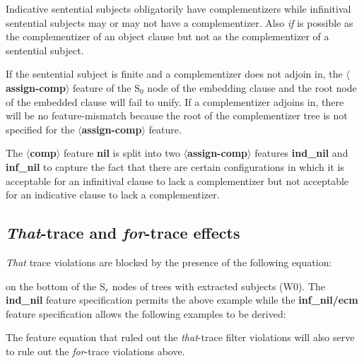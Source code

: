 
Indicative sentential subjects obligatorily have complementizers while
infinitival sentential subjects may or may not have a complementizer. 
Also {\em if} is possible as the complementizer of an object clause
but not as the complementizer of a sentential subject.


If the sentential subject is finite and a complementizer does
not adjoin in, the {\bf $\langle$assign-comp$\rangle$} feature of the 
S$_{0}$ node of the embedding clause and the root node of the
embedded clause will fail to unify. If a complementizer adjoins in,
there will be no feature-mismatch because the root of the
complementizer tree is not specified for the {\bf $\langle$assign-comp$\rangle$} feature.

The {\bf $\langle$comp$\rangle$} feature {\bf nil} is split into two
{\bf $\langle$assign-comp$\rangle$} features {\bf ind\_nil} and
{\bf inf\_nil} to capture the fact that there are certain configurations in
which it is acceptable for an infinitival clause to lack a complementizer
but not acceptable for an indicative clause to lack a complementizer. 

\subsection{{\em That}-trace and {\em for}-trace effects}


{\em That} trace violations are blocked by the presence of the following
equation:


on the bottom of the S$_{r}$ nodes of trees with extracted subjects (W0). 
The {\bf ind\_nil} feature specification permits the above example
while the {\bf inf\_nil/ecm} feature specification allows the
following examples to be derived:


The feature equation that ruled out the {\em that}-trace filter violations
will also serve to rule out the {\em for}-trace violations above.

